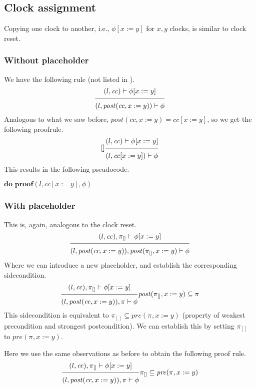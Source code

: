 \documentclass{article}
\newcommand{\proofrule}[3][]{#1 \frac{\raisebox{.7ex}{\normalsize{$#2$}}}
  {\raisebox{-1.0ex}{\normalsize{$#3$}}}}
\newcommand{\placeholder}[1][]{\pi_{#1}}
\newcommand{\loc}{l}
\newcommand{\region}{\mathit{cc}}
\newcommand{\post}{\mathit{post}}
\newcommand{\method}[1]{\ensuremath{\mathbf{#1}}}
\begin{document}
\subsection{Clock assignment}

Copying one clock to another, i.e., $\phi[x := y]$ for $x,y$ clocks, is similar to clock reset.

\subsubsection{Without placeholder}
We have the following rule (not listed in \cite{FC:14report}).
\[
\proofrule
{(\loc, \region) \vdash \phi[x := y]}
{(\loc, \post(\region, x := y)) \vdash \phi}
\]
Analogous to what we saw before, $ \post(\region, x := y) = \region[x := y]$, so we get the following proofrule.
\[
  \proofrule[{[]}]
  {(\loc, \region) \vdash \phi[x := y]}
  {(\loc, \region[x := y]) \vdash \phi}
\]
%
This results in the following pseudocode.
\begin{algorithm}[H]
  \caption{$\method{do\_proof\_assign}(\loc, \region, \phi[x := y]$}
  \begin{algorithmic}
  \RETURN $\method{do\_proof}(\loc, \region[x := y], \phi)$
  \end{algorithmic}
  \end{algorithm}

\subsubsection{With placeholder}
This is, again, analogous to the clock reset.
\[
\proofrule
{(\loc, \region), \placeholder[{[]}] \vdash \phi[x := y]}
{(\loc, \post(\region, x := y)), \post(\placeholder[{[]}], x := y)\vdash \phi}
\]
Where we can introduce a new placeholder, and establish the corresponding sidecondition.
\[
\proofrule
{(\loc, \region), \placeholder[{[]}] \vdash \phi[x := y]}
{(\loc, \post(\region, x := y)), \placeholder \vdash \phi}
\post(\placeholder[{[]}], x := y) \subseteq \placeholder
\]
This sidecondition is equivalent to $\placeholder[{[]}] \subseteq \mathit{pre}(\placeholder, x := y)$ (property of weakest precondition and strongest postcondition). We can establish this by setting  $\placeholder[{[]}]$ to $\mathit{pre}(\placeholder, x := y)$.

Here we use the same observations as before to obtain the following proof rule.
\[
\proofrule
{(\loc, \region), \placeholder[{[]}] \vdash \phi[x := y]}
{(\loc, \post(\region, x := y)), \placeholder \vdash \phi}
\placeholder[{[]}] \subseteq \mathit{pre}(\placeholder, x := y)
\]
\end{document}
